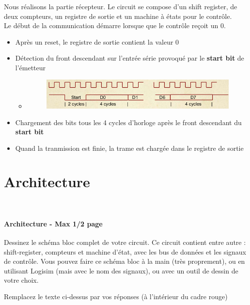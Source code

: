 \documentclass[a4paper]{article} %
\begin{document}


\begin{tcolorbox}[colframe=Monokaimagenta,colback=white]
Nous réalisons la partie récepteur. Le circuit se compose d'un shift register, de deux compteurs, un registre de sortie et un machine à états pour le contrôle.\\
Le début de la communication démarre lorsque que le contrôle reçoit un $0$.

\begin{itemize}
    \item    Après un reset, le registre de sortie contient la valeur $0$
    \item    Détection du front descendant sur l'entrée série provoqué par le \textbf{start bit} de l'émetteur
        \begin{itemize}
            \item    \begin{figure}[H]
                        \centering
                        \includegraphics[width=.8\textwidth]{src/chrono_emetteur.jpg}
                     \label{fig:trame}
                \end{figure}
        \end{itemize}
    \item    Chargement des bits tous les 4 cycles d'horloge après le front descendant du \textbf{start bit}
    \item    Quand la tranmission est finie, la trame est chargée dans le registre de sortie
    
\end{itemize}   
\end{tcolorbox}

\section{Architecture}\

\begin{tcolorbox}[colframe=Monokaimagenta,colback=white]
\paragraph{Architecture - Max 1/2 page}
Dessinez le schéma bloc complet de votre circuit. Ce circuit contient entre autre : shift-register, compteurs et machine d’état, avec les bus de données et les signaux de contrôle. Vous pouvez faire ce schéma bloc à la main (très proprement), ou en utilisant Logisim (mais avec le nom des signaux), ou avec un outil de dessin de votre choix.

Remplacez le texte ci-dessus par vos réponses (à l’intérieur du cadre rouge)\\


\end{tcolorbox}
\end{document}
